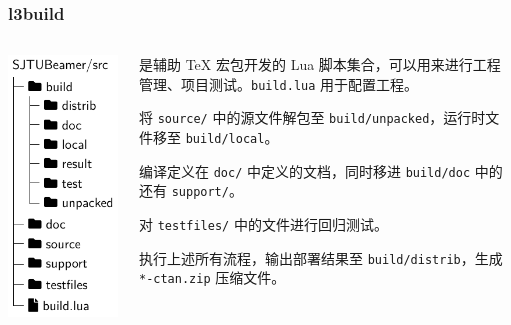 \begin{frame}
  \frametitle{l3build}
  
  \begin{columns}
    \begin{column}{.3\textwidth}
      \includegraphics{support/figures/beamerdir.pdf}
    \end{column}
    \begin{column}{.6\textwidth}
        是辅助 \TeX{} 宏包开发的 Lua 脚本集合，可以用来进行工程管理、项目测试。\texttt{build.lua} 用于配置工程。
    
      \begin{description}
        \small
        \item[\ttfamily l3build unpack] 将 \texttt{source/} 中的源文件解包至 \texttt{build/unpacked}，运行时文件移至 \texttt{build/local}。
        \item[\ttfamily l3build doc] 编译定义在 \texttt{doc/} 中定义的文档，同时移进 \texttt{build/doc} 中的还有 \texttt{support/}。
        \item[\ttfamily l3build check] 对 \texttt{testfiles/} 中的文件进行回归测试。
        \item[\ttfamily l3build ctan] 执行上述所有流程，输出部署结果至 \texttt{build/distrib}，生成 \texttt{*-ctan.zip} 压缩文件。 
      \end{description}
    \end{column}
  \end{columns}

\end{frame}
